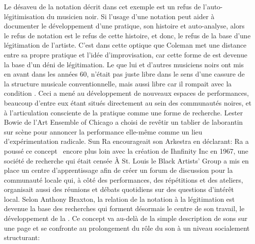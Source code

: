 {Le d\'esaveu de la notation d\'ecrit dans cet exemple est un refus de
l'auto{}-l\'egitimisation du musicien noir. Si l'usage d'une notation
peut aider \`a documenter le d\'eveloppement d'une pratique, son
histoire et auto{}-analyse, alors le refus de notation est le refus de
cette histoire, et donc, le refus de la base d'une l\'egitimation de
l'artiste. C'est dans cette optique que Coleman met une distance entre
sa propre pratique et l'id\'ee d'improvisation, car cette forme de
 est devenue la base d'un d\'eni de l\'egitimation. Le
 que lui et d'autres musiciens noirs ont mis en avant dans
les ann\'ees 60, n'\'etait pas juste libre dans le sens d'une cassure
de la structure musicale conventionnelle, mais aussi libre car il
rompait avec la condition .
Ceci a men\'e au d\'eveloppement de nouveaux espaces de performances,
beaucoup d'entre eux \'etant situ\'es directement au sein des
communaut\'es noires, et \`a l'articulation consciente de la pratique
comme une forme de recherche. Lester Bowie de l'Art Ensemble of Chicago
a choisi de rev\^etir un tablier de laborantin sur sc\`ene pour
annoncer la performance elle{}-m\^eme comme un lieu d'exp\'erimentation
radicale. Sun Ra encourageait son Arkestra en d\'eclarant:  Ra a pouss\'e ce concept \ encore plus loin avec la
cr\'eation de Ihnfinity Inc en 1967, une soci\'et\'e de recherche qui
\'etait cens\'ee  \`A St. Louis le Black Artists' Group a mis en
place un centre d'apprentissage afin de cr\'eer un forum de discussion
pour la communaut\'e locale qui, \`a c\^ot\'e des performances, des
r\'ep\'etitions et des ateliers, organisait aussi des r\'eunions et
d\'ebats quotidiens sur des questions d'int\'er\^et local. Selon
Anthony Braxton, la relation de la notation \`a la l\'egitimation est
devenue la base des recherches qui forment d\'esormais le centre de son
travail, le d\'eveloppement de la . Ce
concept va au{}-del\`a de la simple description de sons sur une page et
se confronte au prolongement du r\^ole du son \`a un niveau socialement
structurant: 

}
